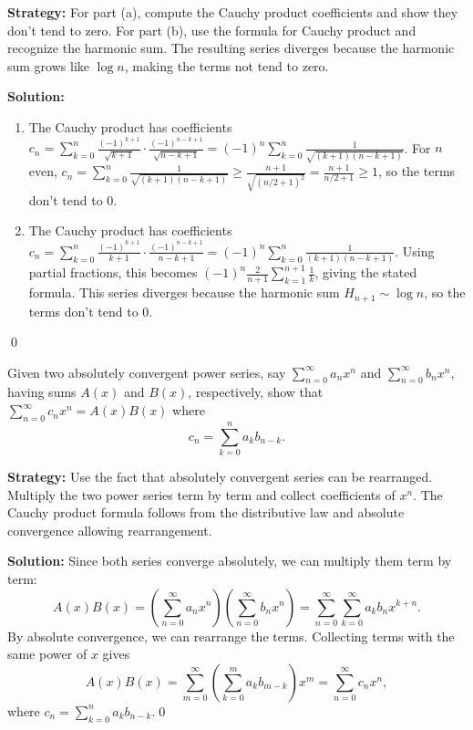 \noindent\textbf{Strategy:} For part (a), compute the Cauchy product coefficients and show they don't tend to zero. For part (b), use the formula for Cauchy product and recognize the harmonic sum. The resulting series diverges because the harmonic sum grows like \(\log n\), making the terms not tend to zero.

\bigskip\noindent\textbf{Solution:}
\begin{enumerate}[label=(\alph*)]
\item The Cauchy product has coefficients \(c_n = \sum_{k=0}^n \frac{(-1)^{k+1}}{\sqrt{k+1}} \cdot \frac{(-1)^{n-k+1}}{\sqrt{n-k+1}} = (-1)^n \sum_{k=0}^n \frac{1}{\sqrt{(k+1)(n-k+1)}}\). For \(n\) even, \(c_n = \sum_{k=0}^n \frac{1}{\sqrt{(k+1)(n-k+1)}} \geq \frac{n+1}{\sqrt{(n/2+1)^2}} = \frac{n+1}{n/2+1} \geq 1\), so the terms don't tend to 0.

\item The Cauchy product has coefficients \(c_n = \sum_{k=0}^n \frac{(-1)^{k+1}}{k+1} \cdot \frac{(-1)^{n-k+1}}{n-k+1} = (-1)^n \sum_{k=0}^n \frac{1}{(k+1)(n-k+1)}\). Using partial fractions, this becomes \((-1)^n \frac{2}{n+1} \sum_{k=1}^{n+1} \frac{1}{k}\), giving the stated formula. This series diverges because the harmonic sum \(H_{n+1} \sim \log n\), so the terms don't tend to 0.
\end{enumerate}\qed



\begin{problembox}
Given two absolutely convergent power series, say \(\sum_{n=0}^{\infty} a_n x^n\) and \(\sum_{n=0}^{\infty} b_n x^n\), having sums \(A(x)\) and \(B(x)\), respectively, show that \(\sum_{n=0}^{\infty} c_n x^n = A(x) B(x)\) where
\[c_n = \sum_{k=0}^{n} a_k b_{n-k}.\]
\end{problembox}

\noindent\textbf{Strategy:} Use the fact that absolutely convergent series can be rearranged. Multiply the two power series term by term and collect coefficients of \(x^n\). The Cauchy product formula follows from the distributive law and absolute convergence allowing rearrangement.

\bigskip\noindent\textbf{Solution:}
Since both series converge absolutely, we can multiply them term by term:
\[A(x) B(x) = \left(\sum_{n=0}^{\infty} a_n x^n\right) \left(\sum_{n=0}^{\infty} b_n x^n\right) = \sum_{n=0}^{\infty} \sum_{k=0}^{\infty} a_k b_n x^{k+n}.\]
By absolute convergence, we can rearrange the terms. Collecting terms with the same power of \(x\) gives
\[A(x) B(x) = \sum_{m=0}^{\infty} \left(\sum_{k=0}^{m} a_k b_{m-k}\right) x^m = \sum_{n=0}^{\infty} c_n x^n,\]
where \(c_n = \sum_{k=0}^{n} a_k b_{n-k}\).\qed



